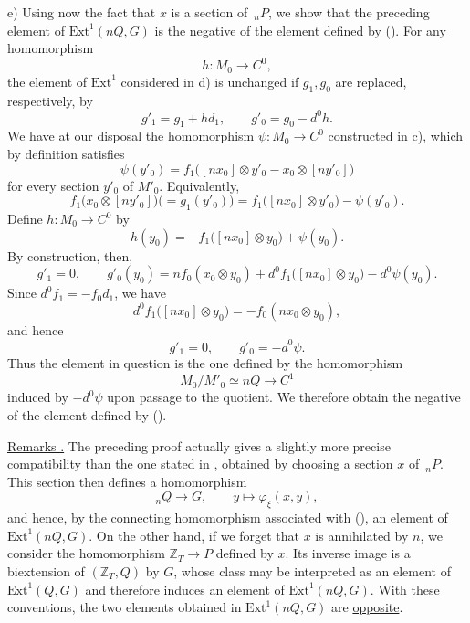 \medskip
\noindent e) Using now the fact that $x$ is a section of $\,{}_nP$,
we show that the preceding element of $\mathrm{Ext}^1(nQ,G)$ is the
negative of the element defined by ().  For any homomorphism
\[
 h:M_0\longrightarrow C^0,
\]
the element of $\mathrm{Ext}^1$ considered in d) is unchanged if
$g_1,g_0$ are replaced, respectively, by
\[
 g'_1=g_1+h d_1,
 \qquad
 g'_0=g_0-d^0h.
\]
We have at our disposal the homomorphism
$\psi:M_0\longrightarrow C^0$ constructed in c), which by definition
satisfies
\[
 \psi(y'_0)=
 f_1\bigl([nx_0]\otimes y'_0-x_0\otimes[ny'_0]\bigr)
\]
for every section $y'_0$ of $M'_0$.  Equivalently,
\[
 f_1\bigl(x_0\otimes[ny'_0]\bigr)
 \bigl(=g_1(y'_0)\bigr)
 =f_1\bigl([nx_0]\otimes y'_0\bigr)-\psi(y'_0).
\]
Define $h:M_0\longrightarrow C^0$ by
\[
 h(y_0)=-f_1\bigl([nx_0]\otimes y_0\bigr)+\psi(y_0).
\]
By construction, then,
\[
 g'_1=0,
 \qquad
 g'_0(y_0)=n f_0(x_0\otimes y_0)
 +d^0f_1\bigl([nx_0]\otimes y_0\bigr)-d^0\psi(y_0).
\]
Since $d^0f_1=-f_0d_1$, we have
\[
 d^0f_1\bigl([nx_0]\otimes y_0\bigr)
 =-f_0(nx_0\otimes y_0),
\]
and hence
\[
 g'_1=0,
 \qquad
 g'_0=-d^0\psi.
\]
Thus the element in question is the one defined by the homomorphism
\[
 M_0/M'_0\simeq nQ\longrightarrow C^1
\]
induced by $-d^0\psi$ upon passage to the quotient.  We therefore
obtain the negative of the element defined by ().

\medskip
\noindent\underline{Remarks .}  The preceding proof actually
gives a slightly more precise compatibility than the one stated in
, obtained by choosing a section $x$ of $\,{}_nP$.  This section
then defines a homomorphism
\[
 {}_nQ\longrightarrow G,
 \qquad
 y\longmapsto\varphi_\xi(x,y),
\]
and hence, by the connecting homomorphism associated with (), an
element of $\mathrm{Ext}^1(nQ,G)$.  On the other hand, if we forget
that $x$ is annihilated by $n$, we consider the homomorphism
$\mathbb Z_T\longrightarrow P$ defined by $x$.  Its inverse image is a
biextension of $(\mathbb Z_T,Q)$ by $G$, whose class may be interpreted
as an element of $\mathrm{Ext}^1(Q,G)$ and therefore induces an element
of $\mathrm{Ext}^1(nQ,G)$.  With these conventions, the two elements
obtained in $\mathrm{Ext}^1(nQ,G)$ are \underline{opposite}.
